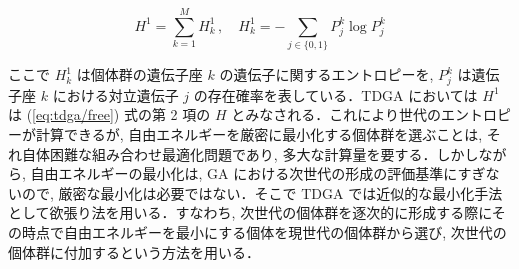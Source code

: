 \begin{equation}
H^1 = \sum_{k=1}^M H^1_k \, ,\quad H^1_k = - \sum_{j\in\{ 0,1\}} P_j^k \log P_j^k \label{eq:entropy_from_allele}
\end{equation}

\noindent
ここで $H^1_k$ は個体群の遺伝子座 $k$ の遺伝子に関するエントロピーを, $P_j^k$ は遺伝子座 $k$ における対立遺伝子 $j$ の存在確率を表している．TDGA においては $H^1$ は (\ref{eq:tdga/free}) 式の第 2 項の $H$ とみなされる．これにより世代のエントロピーが計算できるが, 自由エネルギーを厳密に最小化する個体群を選ぶことは, それ自体困難な組み合わせ最適化問題であり, 多大な計算量を要する．しかしながら, 自由エネルギーの最小化は, GA における次世代の形成の評価基準にすぎないので, 厳密な最小化は必要ではない．そこで TDGA では近似的な最小化手法として欲張り法を用いる．すなわち, 次世代の個体群を逐次的に形成する際にその時点で自由エネルギーを最小にする個体を現世代の個体群から選び, 次世代の個体群に付加するという方法を用いる．

